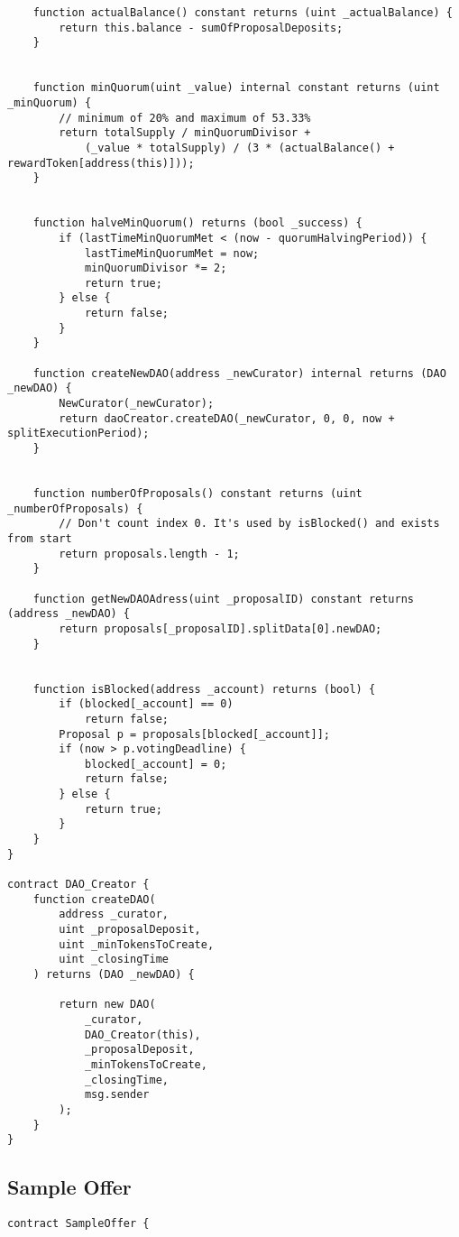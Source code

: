 \documentclass[9pt,oneside]{amsart}
\begin{document}
\begin{appendix}
\begin{verbatim}
    function actualBalance() constant returns (uint _actualBalance) {
        return this.balance - sumOfProposalDeposits;
    }


    function minQuorum(uint _value) internal constant returns (uint _minQuorum) {
        // minimum of 20% and maximum of 53.33%
        return totalSupply / minQuorumDivisor +
            (_value * totalSupply) / (3 * (actualBalance() + rewardToken[address(this)]));
    }


    function halveMinQuorum() returns (bool _success) {
        if (lastTimeMinQuorumMet < (now - quorumHalvingPeriod)) {
            lastTimeMinQuorumMet = now;
            minQuorumDivisor *= 2;
            return true;
        } else {
            return false;
        }
    }

    function createNewDAO(address _newCurator) internal returns (DAO _newDAO) {
        NewCurator(_newCurator);
        return daoCreator.createDAO(_newCurator, 0, 0, now + splitExecutionPeriod);
    }


    function numberOfProposals() constant returns (uint _numberOfProposals) {
        // Don't count index 0. It's used by isBlocked() and exists from start
        return proposals.length - 1;
    }

    function getNewDAOAdress(uint _proposalID) constant returns (address _newDAO) {
        return proposals[_proposalID].splitData[0].newDAO;
    }


    function isBlocked(address _account) returns (bool) {
        if (blocked[_account] == 0)
            return false;
        Proposal p = proposals[blocked[_account]];
        if (now > p.votingDeadline) {
            blocked[_account] = 0;
            return false;
        } else {
            return true;
        }
    }
}

contract DAO_Creator {
    function createDAO(
        address _curator,
        uint _proposalDeposit,
        uint _minTokensToCreate,
        uint _closingTime
    ) returns (DAO _newDAO) {

        return new DAO(
            _curator,
            DAO_Creator(this),
            _proposalDeposit,
            _minTokensToCreate,
            _closingTime,
            msg.sender
        );
    }
}
\end{verbatim}

\subsection{Sample Offer}\label{app:SampleOffer}
\begin{verbatim}
contract SampleOffer {


\end{verbatim}
\end{appendix}
\end{document}
